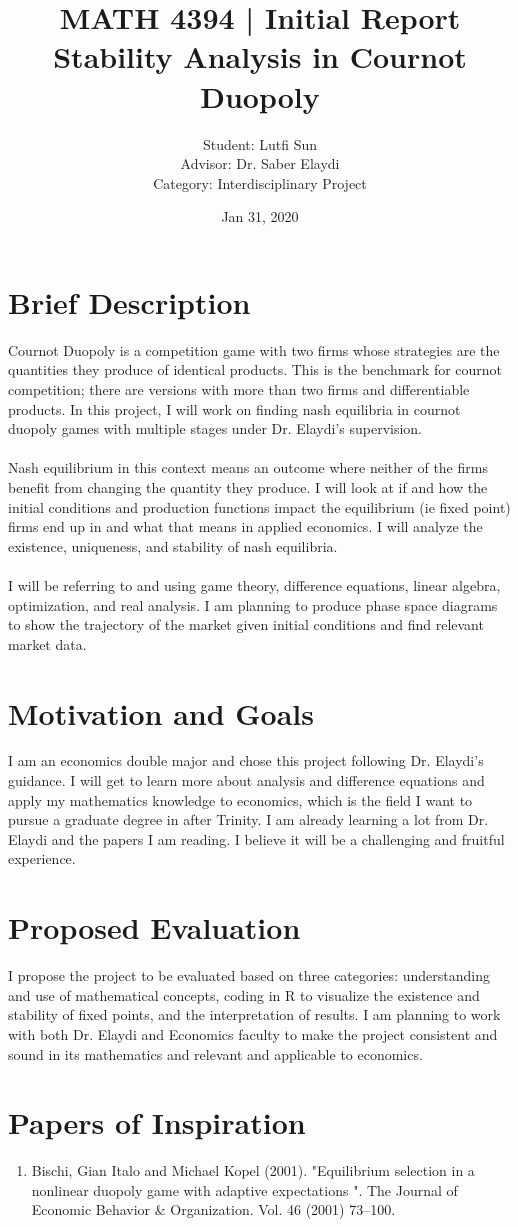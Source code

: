 \documentclass{article}
\title{MATH 4394 | Initial Report \\ Stability Analysis in Cournot Duopoly }
\author{Student: Lutfi Sun \\ 
        Advisor: Dr. Saber Elaydi \\ 
        Category: Interdisciplinary Project}
\date{Jan 31, 2020}
\begin{document}
\maketitle

\section{Brief Description}

    Cournot Duopoly is a competition game with two firms whose strategies are the quantities they produce of identical products. This is the benchmark for cournot competition; there are versions with more than two firms and differentiable products. In this project, I will work on finding nash equilibria in cournot duopoly games with multiple stages under Dr. Elaydi's supervision.
    \\ \\
    Nash equilibrium in this context means an outcome where neither of the firms benefit from changing the quantity they produce. I will look at if and how the initial conditions and production functions impact the equilibrium (ie fixed point) firms end up in and what that means in applied economics. I will analyze the existence, uniqueness, and stability of nash equilibria.
    \\ \\
    I will be referring to and using game theory, difference equations, linear algebra, optimization, and real analysis. I am planning to produce phase space diagrams to show the trajectory of the market given initial conditions and find relevant market data.

\section{Motivation and Goals}

    I am an economics double major and chose this project following Dr. Elaydi's guidance. I will get to learn more about analysis and difference equations and apply my mathematics knowledge to economics, which is the field I want to pursue a graduate degree in after Trinity. I am already learning a lot from Dr. Elaydi and the papers I am reading. I believe it will be a challenging and fruitful experience.

\section{Proposed Evaluation}

    I propose the project to be evaluated based on three categories: understanding and use of mathematical concepts, coding in R to visualize the existence and stability of fixed points, and the interpretation of results. I am planning to work with both Dr. Elaydi and Economics faculty to make the project consistent and sound in its mathematics and relevant and applicable to economics.
    
\section{Papers of Inspiration}

    \begin{enumerate}
        \item Bischi, Gian Italo and Michael Kopel (2001). "Equilibrium selection in a nonlinear duopoly game with adaptive expectations ". The Journal of Economic Behavior & Organization. Vol. 46 (2001) 73–100.
    \end{enumerate}
    
\end{document}
